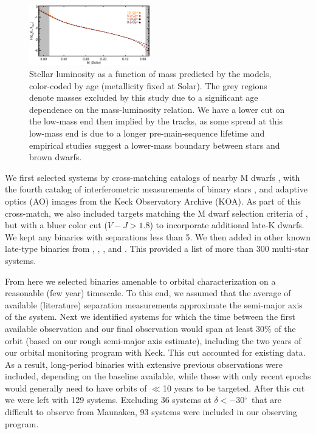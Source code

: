 \documentclass[twocolumn]{aastex62}
\newcommand{\degree}{$^{\circ}$}
\begin{document}
\begin{figure}[htb]
\begin{center}
\includegraphics[width=0.47\textwidth]{Model_age2.eps}
\caption{Stellar luminosity as a function of mass predicted by the \citet{BHAC15} models, color-coded by age (metallicity fixed at Solar). The grey regions denote masses excluded by this study due to a significant age dependence on the mass-luminosity relation. We have a lower cut on the low-mass end then implied by the tracks, as some spread at this low-mass end is due to a longer pre-main-sequence lifetime and empirical studies suggest a lower-mass boundary between stars and brown dwarfs. }
\label{fig:age}
\end{center}
\end{figure}

We first selected systems by cross-matching catalogs of nearby M dwarfs \citep{Lepine:2013, Gaidos2014, 2014ApJ...784..156D,Winters2015}, with the fourth catalog of interferometric measurements of binary stars \citep[INT4,][]{Hartkopf:2001}, and adaptive optics (AO) images from the Keck Observatory Archive (KOA). As part of this cross-match, we also included targets matching the M dwarf selection criteria of \citet{Gaidos2014}, but with a bluer color cut ($V-J>1.8$) to incorporate additional late-K dwarfs. We kept any binaries with separations less than 5\arcsec. We then added in other known late-type binaries from \citet{2008MNRAS.384..150L}, \citet{Jnn2012}, \citet{Jnn2014}, and \citet{Ward-Duong2015}. This provided a list of more than 300 multi-star systems.

From here we selected binaries amenable to orbital characterization on a reasonable (few year) timescale. To this end, we assumed that the average of available (literature) separation measurements approximate the semi-major axis of the system. Next we identified systems for which the time between the first available observation and our final observation would span at least 30\% of the orbit (based on our rough semi-major axis estimate), including the two years of our orbital monitoring program with Keck. This cut accounted for existing data. As a result, long-period binaries with extensive previous observations were included, depending on the baseline available, while those with only recent epochs would generally need to have orbits of $\ll$10 years to be targeted. After this cut we were left with 129 systems. Excluding 36 systems at $\delta<-30$\degree\ that are difficult to observe from Maunakea, 93 systems were included in our observing program. 
\end{document}
